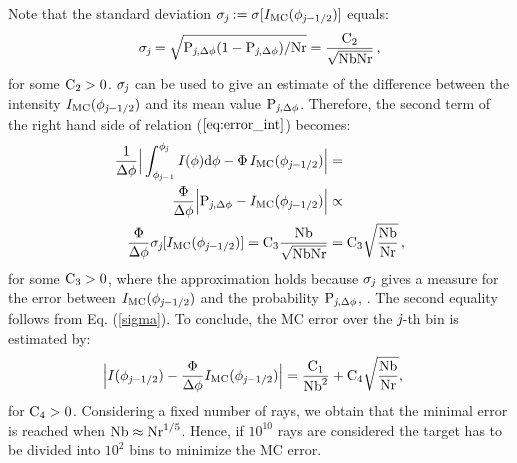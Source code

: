 Note that the standard deviation $\sigma_{\textit{j}}:=\sigma[I_{\textrm{MC}}(\phi_{\textit{j}-1/2})]$ equals:
\begin{equation}\label{sigma}
\sigma_{\textit{j}}= \sqrt{\textrm{P}_{\textit{j}, \Delta\phi}(1-\textrm{P}_{\textit{j}, \Delta\phi})/\textrm{Nr}}= \frac{\textrm{C}_2}{\sqrt{\textrm{Nb}\textrm{Nr}}}\,, \end{equation}
 for some $\textrm{C}_{2}>0$. $\sigma_{\textit{j}}$ can be used to give an estimate of the difference between the intensity $I_{\textrm{MC}}(\phi_{\textit{j}-1/2})$ and its mean value $\textrm{P}_{\textit{j}, \Delta\phi}$.
Therefore, the second term of the right hand side of relation ($\ref{eq:error_int}$) becomes:
\begin{equation}\begin{aligned}
\frac{1}{\Delta \phi}\Big|\int_{\phi_{\textit{j}-1}}^{\phi_{\textit{j}}} I(\phi)\textrm{d}\phi -
\Phi\, I_{\textrm{MC}}(\phi_{\textit{j}-1/2})\Big| &=  \\
\frac{\Phi}{\Delta \phi}\Big|\textrm{P}_{\textit{j}, \Delta\phi} -I_{\textrm{MC}}(\phi_{\textit{j}-1/2})\Big| &\propto  \\
  \frac{\Phi}{\Delta \phi}
\sigma_{\textit{j}}[I_{\textrm{MC}}(\phi_{\textit{j}-1/2})]=\textrm{C}_3\frac{\textrm{Nb}}{\sqrt{\textrm{Nb}\textrm{Nr}}} & = \textrm{C}_3\sqrt{\frac{\textrm{Nb}}{\textrm{Nr}}}\,,
\end{aligned}
\end{equation}
for some $\textrm{C}_3>0$, where the approximation holds because $\sigma_{\textit{j}}$ gives a measure for the error between 
$I_{\textrm{MC}}(\phi_{\textit{j}-1/2})$ and the probability $\textrm{P}_{\textit{j}, \Delta\phi}$, \cite{diez2012openintro}. The second equality follows from Eq. (\ref{sigma}). To conclude, the MC error over the $\textit{j}$-th bin is estimated by:
\begin{equation} \begin{aligned}
\Big|I(\phi_{\textit{j}-1/2})&-\frac{\Phi}
{\Delta\phi}I_{\textrm{MC}}(\phi_{\textit{j}-1/2})\Big| =
\frac{\textrm{C}_1}{\textrm{Nb}^2} + \textrm{C}_4\sqrt{\frac{\textrm{Nb}}{\textrm{Nr}}},
\end{aligned}
\end{equation}
for $\textrm{C}_4>0$.
Considering a fixed number of rays, we obtain that the minimal error is reached when $\textrm{Nb}\approx \textrm{Nr}^{1/5}$.
Hence, if $10^{10}$ rays are considered the target has to be divided into $10^2$ bins to minimize the MC error.
